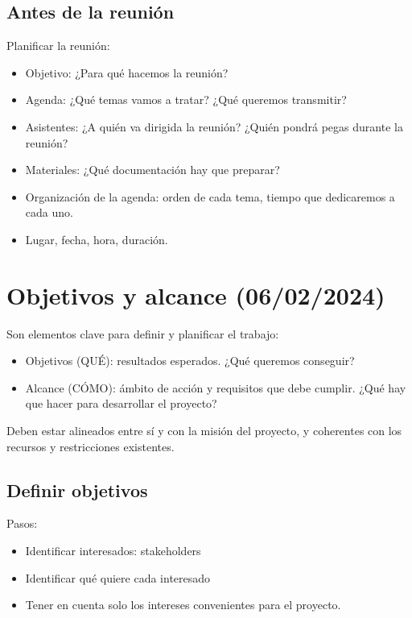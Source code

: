 \documentclass{article}
\begin{document}
\subsection{Antes de la reunión}
Planificar la reunión:
\begin{itemize}
	\item Objetivo: ¿Para qué hacemos la reunión?
	\item Agenda: ¿Qué temas vamos a tratar? ¿Qué queremos transmitir?
	\item Asistentes: ¿A quién va dirigida la reunión? ¿Quién pondrá pegas durante la reunión?
	\item Materiales: ¿Qué documentación hay que preparar?
	\item Organización de la agenda: orden de cada tema, tiempo que dedicaremos a cada uno.
	\item Lugar, fecha, hora, duración.
\end{itemize}
\section{Objetivos y alcance (06/02/2024)}

Son elementos clave para definir y planificar el trabajo:
\begin{itemize}
	\item Objetivos (QUÉ): resultados esperados. ¿Qué queremos conseguir?
	\item Alcance (CÓMO): ámbito de acción y requisitos que debe cumplir. ¿Qué hay que hacer para desarrollar el proyecto?
\end{itemize}

Deben estar alineados entre sí y con la misión del proyecto, y coherentes con los recursos y restricciones existentes. 

\subsection{Definir objetivos}
Pasos:
\begin{itemize}
	\item Identificar interesados: stakeholders
	\item Identificar qué quiere cada interesado
	\item Tener en cuenta solo los intereses convenientes para el proyecto. 
\end{itemize}
\end{document}
